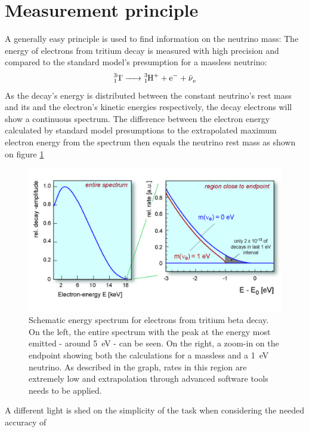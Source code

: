       \section{Measurement principle}
      \label{ch:The KATRIN experiment:sec:Measurement Principle}
      A generally easy principle is used to find information on the neutrino mass: The energy of electrons from tritium decay is measured with high precision and compared to the standard model's presumption for a massless neutrino: 
      \begin{equation}
      	\ce{^3_1T -> ^3_1H^+ + e^- + \bar{\nu}_e}
      \end{equation}
      As the decay's energy is distributed between the constant neutrino's rest mass and its and the electron's kinetic energies respectively, the decay electrons will show a continuous spectrum. The difference between the electron energy calculated by standard model presumptions to the extrapolated maximum electron energy from the spectrum then equals the neutrino rest mass as shown on figure \ref{fig:katrinExperiment:tritiumSpectrum}
      \begin{figure}
	\centering
      	\includegraphics[width = 0.9 \textwidth]{graphics/katrinExperiment/electronSpectrum.jpg}
      	\caption[Schematic tritium energy spectrum]{Schematic energy spectrum for electrons from tritium beta decay. On the left, the entire spectrum with the peak at the energy most emitted - around \SI{5}{\electronvolt} - can be seen. On the right, a zoom-in on the endpoint showing both the calculations for a massless and a \SI{1}{\electronvolt} neutrino. As described in the graph, rates in this region are extremely low and extrapolation through advanced software tools needs to be applied.}
      	\label{fig:katrinExperiment:tritiumSpectrum}
      \end{figure}
      A different light is shed on the simplicity of the task when considering the needed accuracy of 

